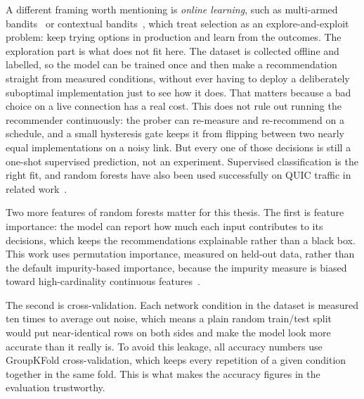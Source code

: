 A different framing worth mentioning is \emph{online learning}, such as multi-armed
bandits~\cite{vermorel2005multiarmed} or contextual
bandits~\cite{lu2010contextual}, which treat selection as an
explore-and-exploit problem: keep trying options in production and learn from
the outcomes. The exploration part is what does not fit here. The dataset is
collected offline and labelled, so the model can be trained once and then make
a recommendation straight from measured conditions, without ever having to
deploy a deliberately suboptimal implementation just to see how it does. That
matters because a bad choice on a live connection has a real cost. This does
not rule out running the recommender continuously: the prober can re-measure
and re-recommend on a schedule, and a small hysteresis gate keeps it from
flipping between two nearly equal implementations on a noisy link. But every
one of those decisions is still a one-shot supervised prediction, not an
experiment. Supervised classification is the right fit, and random forests
have also been used successfully on QUIC traffic in related
work~\cite{app2023quicensemble}.

Two more features of random forests matter for this thesis. The first is
feature importance: the model can report how much each input contributes to
its decisions, which keeps the recommendations explainable rather than a black
box. This work uses permutation importance, measured on held-out data, rather
than the default impurity-based importance, because the impurity measure is
biased toward high-cardinality continuous features~\cite{strobl2007bias}.

The second is cross-validation. Each network condition in the dataset is
measured ten times to average out noise, which means a plain random
train/test split would put near-identical rows on both sides and make the
model look more accurate than it really is. To avoid this leakage, all
accuracy numbers use GroupKFold cross-validation, which keeps every repetition
of a given condition together in the same fold. This is what makes the
accuracy figures in the evaluation trustworthy.
